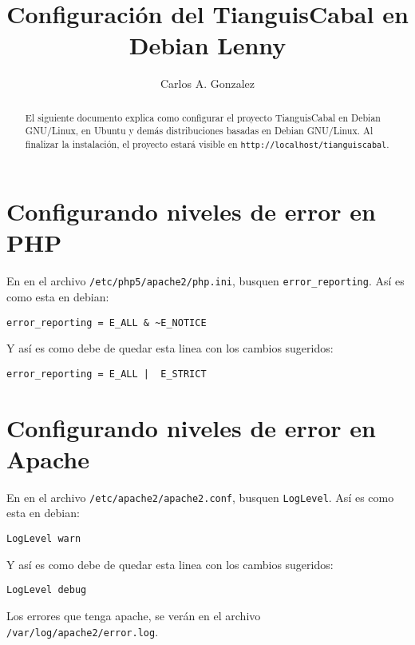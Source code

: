 \documentclass[a4paper,10pt]{article}
\title{Configuración del TianguisCabal en Debian Lenny}
\author{Carlos A. Gonzalez}
\newenvironment{mylisting}
{\begin{list}{}{\setlength{\leftmargin}{1em}}\item\scriptsize\bfseries}
{\end{list}}
\begin{document}
\maketitle

\begin{abstract}
El siguiente documento explica como configurar el proyecto TianguisCabal en Debian GNU/Linux, en Ubuntu y demás distribuciones basadas en Debian GNU/Linux. Al finalizar la instalación, el proyecto estará visible en \texttt{http://localhost/tianguiscabal}. 
\end{abstract}

\section{Configurando niveles de error en PHP}

En en el archivo \texttt{/etc/php5/apache2/php.ini}, busquen \texttt{error\_reporting}. Así  es como esta en debian:

\begin{mylisting} \begin{verbatim}
error_reporting = E_ALL & ~E_NOTICE
\end{verbatim} \end{mylisting}

Y así es como debe de quedar esta linea con los cambios sugeridos:

\begin{mylisting} \begin{verbatim}
error_reporting = E_ALL |  E_STRICT
\end{verbatim} \end{mylisting}

\section{Configurando niveles de error en Apache}

En en el archivo \texttt{/etc/apache2/apache2.conf}, busquen \texttt{LogLevel}. Así es como esta en debian:

\begin{mylisting} \begin{verbatim}
LogLevel warn
\end{verbatim} \end{mylisting}

Y así es como debe de quedar esta linea con los cambios sugeridos:

\begin{mylisting} \begin{verbatim}
LogLevel debug
\end{verbatim} \end{mylisting}

Los errores que tenga apache, se verán en el archivo \texttt{/var/log/apache2/error.log}.
\end{document}
